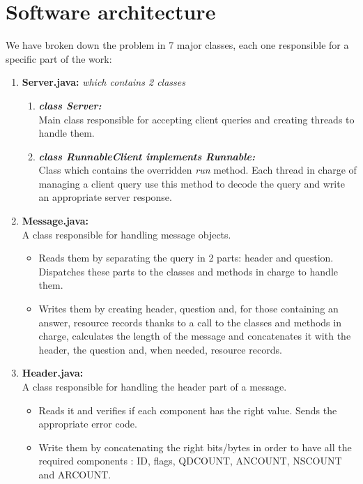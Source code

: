 \documentclass[a4paper, 11pt]{article}
\begin{document}
\section{Software architecture}
We have broken down the problem in 7 major classes, each one responsible for a specific part of the work:
\begin{enumerate}
    \item \textbf{Server.java:} \textit{which contains 2 classes}
    \begin{enumerate}
            \item \textbf{\textit{class Server:}}\\
            Main class responsible for accepting client queries and creating threads to handle them.

            \item \textbf{\textit{class RunnableClient implements Runnable:}}\\
            Class which contains the overridden \textit{run} method. Each thread in charge of managing a client query use this method to decode the query and write an appropriate server response.
    \end{enumerate}
    \item \textbf{Message.java:}\\
    A class responsible for handling message objects. 
    \begin{itemize}
        \item Reads them by separating the query in 2 parts: header and question. Dispatches these parts to the classes and methods in charge to handle them.
        \item Writes them by creating header, question and, for those containing an answer, resource records thanks to a call to the classes and methods in charge, calculates the length of the message and concatenates it with the header, the question and, when needed, resource records.
    \end{itemize}
    \item \textbf{Header.java:}\\
    A class responsible for handling the header part of a message.
    \begin{itemize}
        \item Reads it and verifies if each component has the right value. Sends the appropriate error code.
        \item Write them by concatenating the right bits/bytes in order to have all the required components : ID, flags, QDCOUNT, ANCOUNT, NSCOUNT and ARCOUNT.

\end{itemize}
\end{enumerate}
\end{document}
